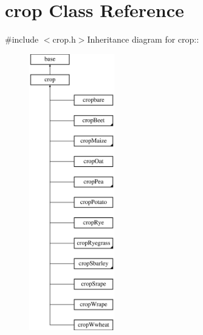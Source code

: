 \hypertarget{classcrop}{
\section{crop Class Reference}
\label{classcrop}
}


{\ttfamily \#include $<$crop.h$>$}Inheritance diagram for crop::\begin{figure}[H]
\begin{center}
\leavevmode
\includegraphics[height=12cm]{classcrop}
\end{center}
\end{figure}
